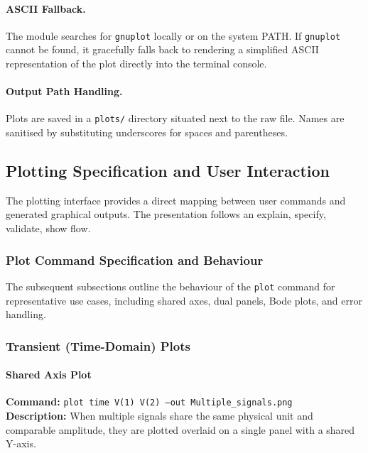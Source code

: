 \paragraph{ASCII Fallback.}
The module searches for \texttt{gnuplot} locally or on the system PATH. If \texttt{gnuplot} cannot be found, it gracefully falls back to rendering a simplified ASCII representation of the plot directly into the terminal console.

\paragraph{Output Path Handling.}
Plots are saved in a \texttt{plots/} directory situated next to the raw file. Names are sanitised by substituting underscores for spaces and parentheses.

\subsection{Plotting Specification and User Interaction}
\label{sec:plot-spec}

The plotting interface provides a direct mapping between user commands and generated graphical outputs. The presentation follows an explain, specify, validate, show flow.

\subsubsection{Plot Command Specification and Behaviour}
\label{sec:plot-spec2}

The subsequent subsections outline the behaviour of the \texttt{plot} command for representative use cases, including shared axes, dual panels, Bode plots, and error handling.

\subsubsection{Transient (Time-Domain) Plots}
\label{sssec:tran-plots}

\paragraph{Shared Axis Plot}
\textbf{Command:} \texttt{plot time V(1) V(2) --out Multiple\_signals.png}\\
\textbf{Description:} When multiple signals share the same physical unit and comparable amplitude, they are plotted overlaid on a single panel with a shared Y-axis.

